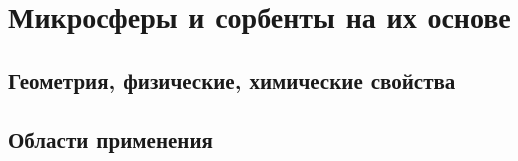 \section{Микросферы и сорбенты на их основе}
\label{section_1_3}

\subsection{Геометрия, физические, химические свойства}
\label{section_1_3_1}

\subsection{Области применения}
\label{section_1_3_2}